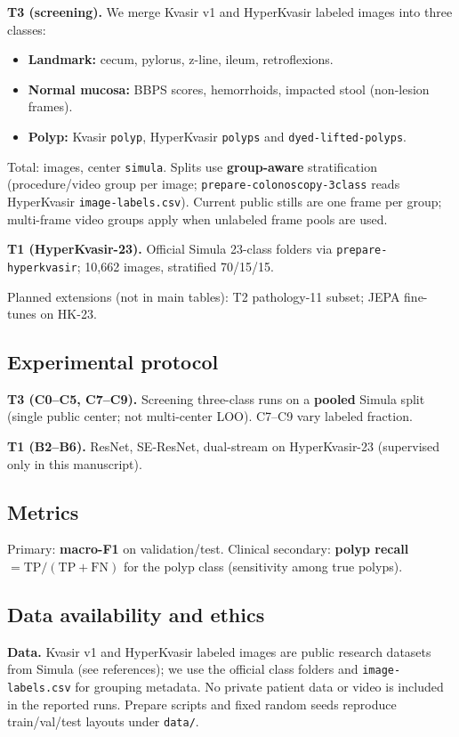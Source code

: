 \textbf{T3 (screening).}
We merge Kvasir v1 and HyperKvasir labeled images into three classes:
\begin{itemize}
  \item \textbf{Landmark:} cecum, pylorus, z-line, ileum, retroflexions.
  \item \textbf{Normal mucosa:} BBPS scores, hemorrhoids, impacted stool (non-lesion frames).
  \item \textbf{Polyp:} Kvasir \texttt{polyp}, HyperKvasir \texttt{polyps} and \texttt{dyed-lifted-polyps}.
\end{itemize}
Total: \numsamples{} images, center \texttt{simula}.
Splits use \textbf{group-aware} stratification (procedure/video group per image; \texttt{prepare-colonoscopy-3class} reads HyperKvasir \texttt{image-labels.csv}).
Current public stills are one frame per group; multi-frame video groups apply when unlabeled frame pools are used.

\textbf{T1 (HyperKvasir-23).}
Official Simula 23-class folders via \texttt{prepare-hyperkvasir}; 10{,}662 images, stratified 70/15/15.

Planned extensions (not in main tables): T2 pathology-11 subset; JEPA fine-tunes on HK-23.

\subsection{Experimental protocol}
\label{sec:protocol}

\textbf{T3 (C0--C5, C7--C9).} Screening three-class runs on a \textbf{pooled} Simula split (single public center; not multi-center LOO). C7--C9 vary labeled fraction.

\textbf{T1 (B2--B6).} ResNet, SE-ResNet, dual-stream on HyperKvasir-23 (supervised only in this manuscript).

\subsection{Metrics}
Primary: \textbf{macro-F1} on validation/test.
Clinical secondary: \textbf{polyp recall} $= \mathrm{TP}/(\mathrm{TP}+\mathrm{FN})$ for the polyp class (sensitivity among true polyps).

\subsection{Data availability and ethics}
\label{sec:ethics}

\textbf{Data.} Kvasir v1 and HyperKvasir labeled images are public research datasets from Simula (see references); we use the official class folders and \texttt{image-labels.csv} for grouping metadata.
No private patient data or video is included in the reported runs.
Prepare scripts and fixed random seeds reproduce train/val/test layouts under \texttt{data/}.

